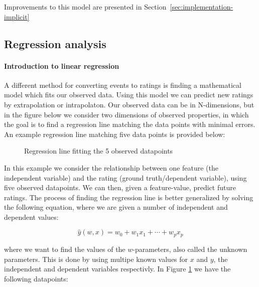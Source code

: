 Improvements to this model are presented in
Section~\ref{sec:implementation-implicit}

\subsection{Regression analysis}
\label{sec:regression-sota}

\paragraph{Introduction to linear regression}
A different method for converting events to ratings is finding a mathematical
model which fits our observed data. Using this model we can predict new ratings
by extrapolation or intrapolaton. Our observed data can be in N-dimensions, but
in the figure below we consider two dimensions of observed properties, in which
the goal is to find a regression line matching the data points with minimal
errors. An example regression line matching five data points is provided below:

\begin{figure}[H]
  \centering
  \label{fig-regression}
  \caption{Regression line fitting the 5 observed datapoints}
\end{figure}

In this example we consider the relationship between one feature (the
independent variable) and the rating (ground truth/dependent variable), using
five observed datapoints. We can then, given a feature-value, predict future
ratings. The process of finding the regression line is better generalized by
solving the following equation, where we are given a number of independent and
dependent values:

\begin{equation}
  \label{eq-regression}
  \hat{y}(w,x) = w_0 + w_1 x_1 + \cdots + w_p x_p
\end{equation}

where we want to find the values of the $w$-parameters, also called the unknown
parameters. This is done by using multipe known values for $x$ and $y$, the
independent and dependent variables respectivly. In Figure \ref{fig-regression}
we have the following datapoints:

